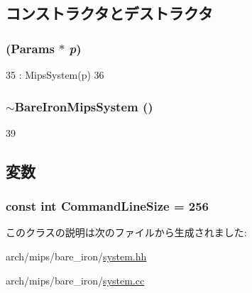 \subsection{コンストラクタとデストラクタ}
\hypertarget{classBareIronMipsSystem_a213e0c64cf8e02084aa021bb7b9a6462}{
\subsubsection[{BareIronMipsSystem}]{ ({\bf Params} $\ast$ {\em p})}}
\label{classBareIronMipsSystem_a213e0c64cf8e02084aa021bb7b9a6462}



\begin{DoxyCode}
35     : MipsSystem(p)
36 { }
\end{DoxyCode}
\hypertarget{classBareIronMipsSystem_aa8cc64ec6f555ee5cf4286851071e0c0}{
\subsubsection[{$\sim$BareIronMipsSystem}]{\setlength{\rightskip}{0pt plus 5cm}$\sim${\bf BareIronMipsSystem} ()}}
\label{classBareIronMipsSystem_aa8cc64ec6f555ee5cf4286851071e0c0}



\begin{DoxyCode}
39 { }
\end{DoxyCode}


\subsection{変数}
\hypertarget{classBareIronMipsSystem_a40cf7cde1351c066dee545df2832e4c7}{
\subsubsection[{CommandLineSize}]{\setlength{\rightskip}{0pt plus 5cm}const int {\bf CommandLineSize} = 256}}
\label{classBareIronMipsSystem_a40cf7cde1351c066dee545df2832e4c7}


このクラスの説明は次のファイルから生成されました:\begin{DoxyCompactItemize}
\item 
arch/mips/bare\_\-iron/\hyperlink{arch_2mips_2bare__iron_2system_8hh}{system.hh}\item 
arch/mips/bare\_\-iron/\hyperlink{arch_2mips_2bare__iron_2system_8cc}{system.cc}\end{DoxyCompactItemize}

